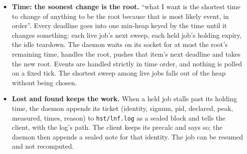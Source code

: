 \begin{itemize}
\begin{itemize}
\item The head's shadow time S is the earliest moment at which the running jobs' releases, taken in order of their expected ends e\_\allowbreak{}j = start\_\allowbreak{}j + t\_\allowbreak{}σj, free enough room: the least S with H + Σ\_\allowbreak{}\{e\_\allowbreak{}j ≤ S\} max(r\_\allowbreak{}j, u\_\allowbreak{}j) ≥ d\_\allowbreak{}h.
\item The spare at S is X = H + Σ\_\allowbreak{}\{e\_\allowbreak{}j ≤ S\} max(r\_\allowbreak{}j, u\_\allowbreak{}j) − d\_\allowbreak{}h: room the head will not need even when it starts.
\item A waiting job k behind the head is admitted now if d\_\allowbreak{}k ≤ H and either it ends before the shadow (now + t\_\allowbreak{}σk ≤ S) or it fits in the spare (d\_\allowbreak{}k ≤ X, and then X falls by d\_\allowbreak{}k).
\item A job whose signum has no history has no duration: it can never be proved not to delay the head, and it is not backfilled. It waits its turn, and its first run records (p\_\allowbreak{}σ, t\_\allowbreak{}σ).
\item If a job overruns its expected end, the head's shadow moves later. That is measured and reported like a growth, never hidden.
\end{itemize}
\item \textbf{Time: the soonest change is the root.} “what I want is the shortest time to change of anything to be the root because that is most likely event, in order”. Every deadline goes into one min-heap keyed by the time until it changes something: each live job's next sweep, each held job's holding expiry, the idle teardown. The daemon waits on its socket for at most the root's remaining time, handles the root, pushes that item's next deadline and takes the new root. Events are handled strictly in time order, and nothing is polled on a fixed tick. The shortest sweep among live jobs falls out of the heap without being chosen.
\item \textbf{Lost and found keeps the work.} When a held job stalls past its holding time, the daemon appends its ticket (identity, signum, pid, declared, peak, measured, times, reason) to \texttt{hst/\allowbreak{}lnf.\allowbreak{}log} as a sealed block and tells the client, with the log's path. The client keeps its precalc and says so; the daemon then appends a sealed note for that identity. The job can be resumed and not recomputed.
\end{itemize}

